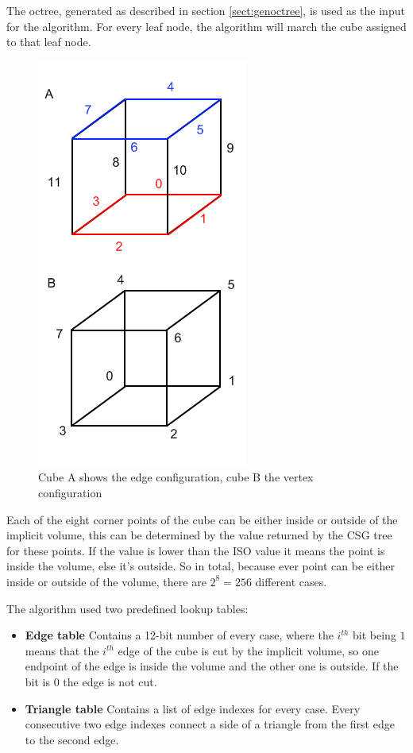 \documentclass[a4wide,10pt,twocolumn]{article}
\begin{document}
The octree, generated as described in section \ref{sect:genoctree}, is used as the input for the algorithm. For every leaf node, the algorithm will march the cube assigned to that leaf node.

    \begin{figure}[h]
        \begin{center}
            \includegraphics[scale=0.6]{./images/cube_config}
        \end{center}
        \caption{Cube A shows the edge configuration, cube B the vertex configuration}
        \label{figure:cube_config}
    \end{figure}

Each of the eight corner points of the cube can be either inside or outside of the implicit volume, this can be determined by the value returned by the CSG tree for these points. If the value is lower than the ISO value it means the point is inside the volume, else it's outside. So in total, because ever point can be either inside or outside of the volume, there are $2^8 = 256$ different cases.

The algorithm used two predefined lookup tables:

\begin{itemize}
    \item[] \textbf{Edge table} Contains a 12-bit number of every case, where the $i^{th}$ bit being $1$ means that the $i^{th}$ edge of the cube is cut by the implicit volume, so one endpoint of the edge is inside the volume and the other one is outside. If the bit is $0$ the edge is not cut.
    \item[] \textbf{Triangle table} Contains a list of edge indexes for every case. Every consecutive two edge indexes connect a side of a triangle from the first edge to the second edge.
\end{itemize}
\end{document}
